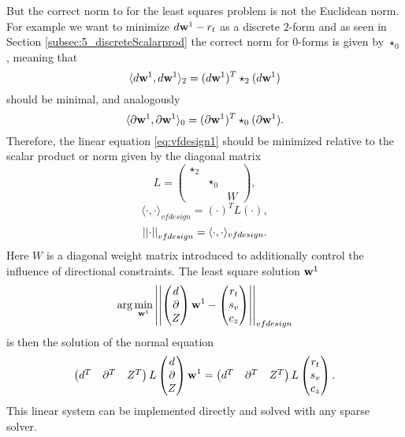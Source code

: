 But the correct norm to for the least squares problem is not the Euclidean norm. For example we want to minimize $d\textbf{w}^1-r_t$ as a discrete $2$-form and as seen in Section \ref{subsec:5_discreteScalarprod} the correct norm for $0$-forms is given by $\star_0$, meaning that
\[\langle d\textbf{w}^1, d\textbf{w}^1 \rangle_2 = (d\textbf{w}^1)^T \star_2 (d\textbf{w}^1)
\]
should be minimal, and analogously
\[\langle \partial \textbf{w}^1, \partial\textbf{w}^1 \rangle_0 = (\partial\textbf{w}^1)^T \star_0 (\partial\textbf{w}^1).\]
Therefore, the linear equation \ref{eq:vfdesign1}
should be minimized relative to the scalar product or norm given by the diagonal matrix
\[L = \begin{pmatrix}
\star_2 & & \\
 & \star_0 & \\
 & & W
\end{pmatrix},\]
\[\langle \cdot , \cdot\rangle_{vfdesign} = (\cdot)^T L (\cdot),\]
\[\left| \left|  \cdot \right| \right|_{vfdesign} = \langle \cdot,\cdot \rangle_{vfdesign}.\]
Here $W$ is a diagonal weight matrix introduced to additionally control the influence of directional constraints. The least square solution $\textbf{w}^1$ 
\[\arg\min_{\textbf{w}^1}\left| \left| \begin{pmatrix} d \\
\partial \\
Z
\end{pmatrix} 
\textbf{w}^1 - \begin{pmatrix}
r_t \\
s_v \\
c_z
\end{pmatrix} \right| \right|_{vfdesign}\]
is then the solution of the normal equation 
\begin{equation}\begin{pmatrix} d^T & \partial^T & Z^T \end{pmatrix} L \begin{pmatrix} d \\
\partial \\
Z
\end{pmatrix} \textbf{w}^1= \begin{pmatrix} d^T & \partial^T & Z^T \end{pmatrix} L \begin{pmatrix}
r_t \\
s_v \\
c_z
\end{pmatrix}. \label{eq:vfdesignLQ}\end{equation}
This linear system can be implemented directly and solved with any sparse solver.

